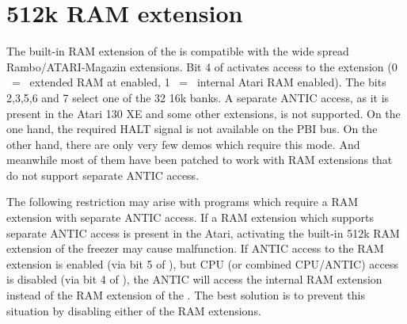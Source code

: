 \chapter{512k RAM extension}

The built-in RAM extension of the \frz is compatible with the wide spread
Rambo/ATARI-Magazin extensions. Bit 4 of  activates access to the
extension (0 ~=~ extended RAM at  enabled, 1 ~=~ internal
Atari RAM enabled). The bits 2,3,5,6 and 7 select one of the 32 16k banks. A
separate ANTIC access, as it is present in the Atari 130 XE and some other
extensions, is not supported.
On the one hand, the required HALT signal is not available on the PBI bus. On
the other hand, there are only very few demos which require this mode. And
meanwhile most of them have been patched to work with RAM extensions that do not support
separate ANTIC access.

The following restriction may arise with programs which require a RAM extension
with separate ANTIC access. If a RAM extension which supports separate ANTIC
access is present in the Atari, activating the built-in 512k RAM extension of
the freezer may cause malfunction. If  ANTIC access to the RAM extension is enabled
(via bit 5 of ), but CPU (or combined CPU/ANTIC) access is disabled
(via bit 4 of ), the ANTIC will access the internal RAM extension
instead of the RAM extension of the \frz. The best solution is to prevent
this situation by disabling either of the RAM extensions.

